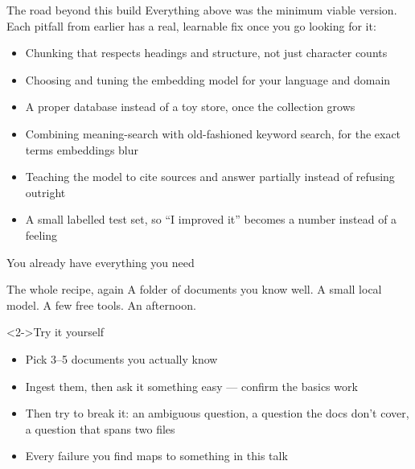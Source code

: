 \documentclass[aspectratio=169,11pt]{beamer}
\begin{document}
\begin{frame}{The road beyond this build}
  Everything above was the minimum viable version. Each pitfall from
  earlier has a real, learnable fix once you go looking for it:
  \begin{itemize}[<+->]
    \item Chunking that respects headings and structure, not just
          character counts
    \item Choosing and tuning the embedding model for your language and
          domain
    \item A proper database instead of a toy store, once the collection
          grows
    \item Combining meaning-search with old-fashioned keyword search, for
          the exact terms embeddings blur
    \item Teaching the model to cite sources and answer partially instead
          of refusing outright
    \item A small labelled test set, so ``I improved it'' becomes a
          number instead of a feeling
  \end{itemize}
  \medskip
\end{frame}

\begin{frame}{You already have everything you need}
  \begin{block}{The whole recipe, again}
    A folder of documents you know well. A small local model. A few free
    tools. An afternoon.
  \end{block}
  \medskip
  \begin{exampleblock}<2->{Try it yourself}
    \begin{itemize}
      \item Pick 3--5 documents you actually know
      \item Ingest them, then ask it something easy --- confirm the basics
            work
      \item Then try to break it: an ambiguous question, a question the
            docs don't cover, a question that spans two files
      \item Every failure you find maps to something in this talk
    \end{itemize}
  \end{exampleblock}
  \medskip
\end{frame}
\end{document}

